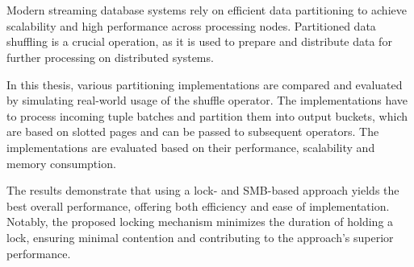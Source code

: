 \chapter{\abstractname}

Modern streaming database systems rely on efficient data partitioning to achieve scalability and high performance across processing nodes. Partitioned data shuffling is a crucial operation, as it is used to prepare and distribute data for further processing on distributed systems.

In this thesis, various partitioning implementations are compared and evaluated by simulating real-world usage of the shuffle operator. The implementations have to process incoming tuple batches and partition them into output buckets, which are based on slotted pages and can be passed to subsequent operators. The implementations are evaluated based on their performance, scalability and memory consumption.

The results demonstrate that using a lock- and \ac{SMB}-based approach yields the best overall performance, offering both efficiency and ease of implementation. Notably, the proposed locking mechanism minimizes the duration of holding a lock, ensuring minimal contention and contributing to the approach's superior performance.
